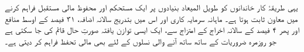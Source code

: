 \documentclass[a4paper,12pt]{article}
\newcommand{\urdutextblock}[1]{%
	\begin{urdu}%
			\large\urdufont #1%
	\end{urdu}%
}
\begin{document}
\urdutextblock{یہی طریقۂ کار خاندانوں کو طویل المیعاد بنیادوں پر ایک مستحکم اور محفوظ مالی مستقبل فراہم کرنے میں معاون ثابت ہوتا ہے۔ ماہانہ سرمایہ کاری اور اس میں بتدریج سالانہ اضافہ، ۳۱ فیصد کے اوسط منافع اور پھر ۴ فیصد کے سالانہ اخراج کے امتزاج سے، ایک ایسی توازن یافتہ صورتِ حال قائم کی جا سکتی ہے جو روزمرہ ضروریات کے ساتھ ساتھ آنے والی نسلوں کے لئے بھی مالی تحفظ فراہم کر دیتی ہے۔}

	
\end{document}
